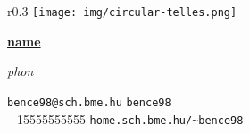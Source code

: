 \documentclass[10pt, oneside, final]{article}
\newcommand{\namestyle}{full}
\newcommand{\occupation}{\occupEmbDev}
\newcommand{\firmname}{\firmProlan}
\newcommand{\dispname}{\expandafter\csname\namestyle name\endcsname}
\newcommand{\phonetic}{\expandafter\csname\namestyle phon\endcsname}
\begin{document}
  \thispagestyle{empty}
  
  \begin{wrapfigure}{r}{0.3\textwidth}
  \texttt{[image: img/circular-telles.png]}
  \end{wrapfigure}

  \underline{\large\textsf{\textbf{\dispname}}}\vspace{2pt}\\
  {\tiny\emph{\phonetic}\par}

  {\firmname}

  \emph{\occupation}

  \vfill 
  {\faEnvelope} \texttt{bence98@sch.bme.hu} \hfill 
  {\faGithub} \texttt{bence98} \\
  {\faPhone} +1{\textendash}555{\textendash}555{\textendash}5555 \hfill
  {\faGlobe} \texttt{home.sch.bme.hu/\textasciitilde bence98}
  
\end{document}
